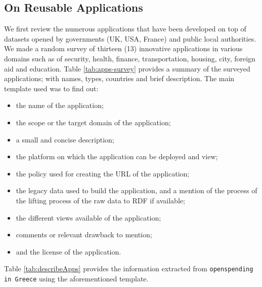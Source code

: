 \subsection{On Reusable Applications} \label{sec:reusable}

We first review the numerous applications that have been developed on top of datasets  opened by governments (UK, USA, France) and public local authorities. We made a random survey of thirteen (13) innovative applications \cite{deliverable2012a} in various domains such as of security, health, finance, transportation, housing, city, foreign aid and education. Table \ref{tab:apps-survey} provides a summary of the surveyed applications; with names, types, countries and brief description. 
The main template used was to find out:
\begin{itemize}
\item the name of the application;
\item the scope or the target domain of the application;
\item a small and concise description;
\item the platform on which the application can be deployed and view;
\item the policy used for creating the URL of the application;
\item the legacy data used to build the application, and a mention of the process of the lifting process of the raw data to RDF if available;
\item the different views available of the application;
\item comments or relevant drawback to mention;
\item and the license of the application.
\end{itemize}
 Table \ref{tab:describeApps} provides the information extracted from \texttt{openspending in Greece} using the aforementioned template. 


